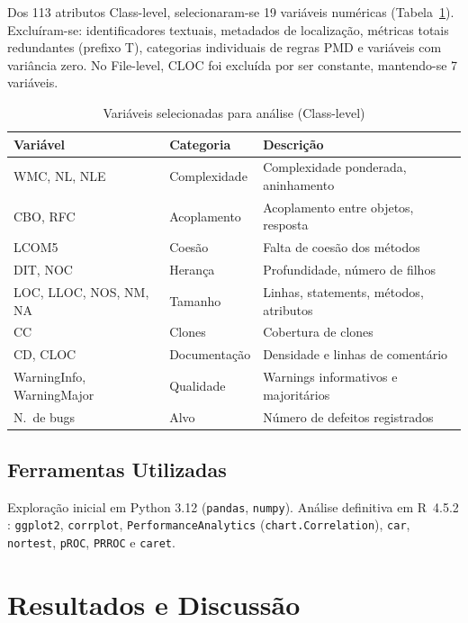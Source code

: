\documentclass[12pt]{article}
\begin{document}
Dos 113 atributos Class-level, selecionaram-se 19 variáveis numéricas (Tabela~\ref{tab:selecao}). Excluíram-se: identificadores textuais, metadados de localização, métricas totais redundantes (prefixo T), categorias individuais de regras PMD e variáveis com variância zero. No File-level, CLOC foi excluída por ser constante, mantendo-se 7 variáveis.

\begin{table}[H]
\centering
\caption{Variáveis selecionadas para análise (Class-level)}
\label{tab:selecao}
\footnotesize
\begin{tabular}{llp{4.5cm}}
\toprule
\textbf{Variável} & \textbf{Categoria} & \textbf{Descrição} \\
\midrule
WMC, NL, NLE      & Complexidade & Complexidade ponderada, aninhamento \\
CBO, RFC          & Acoplamento  & Acoplamento entre objetos, resposta \\
LCOM5             & Coesão       & Falta de coesão dos métodos \\
DIT, NOC          & Herança      & Profundidade, número de filhos \\
LOC, LLOC, NOS, NM, NA & Tamanho & Linhas, statements, métodos, atributos \\
CC                & Clones       & Cobertura de clones \\
CD, CLOC          & Documentação & Densidade e linhas de comentário \\
WarningInfo, WarningMajor & Qualidade & Warnings informativos e majoritários \\
N.\ de bugs       & Alvo         & Número de defeitos registrados \\
\bottomrule
\end{tabular}
\end{table}

\subsection{Ferramentas Utilizadas}

Exploração inicial em Python 3.12 (\texttt{pandas}, \texttt{numpy}). Análise definitiva em R~4.5.2 \cite{rcoreteam2024}: \texttt{ggplot2}, \texttt{corrplot}, \texttt{PerformanceAnalytics} (\texttt{chart.Correlation}), \texttt{car}, \texttt{nortest}, \texttt{pROC}, \texttt{PRROC} e \texttt{caret}.

\section{Resultados e Discussão} \label{sec:resultados}
\end{document}
